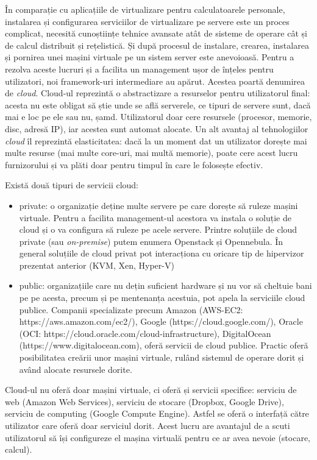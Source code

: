 În comparație cu aplicațiile de virtualizare pentru calculatoarele personale,
instalarea și configurarea serviciilor de virtualizare pe servere este un proces
complicat, necesită cunoștiințe tehnice avansate atât de sisteme de operare cât
și de calcul distribuit și rețelistică. Și după procesul de instalare, crearea,
instalarea și pornirea unei mașini virtuale pe un sistem server este anevoioasă.
Pentru a rezolva aceste lucruri și a facilita un management ușor de înțeles
pentru utilizatori, noi framework-uri intermediare au apărut. Acestea poartă
denumirea de \textit{cloud}. Cloud-ul reprezintă o abstractizare a resurselor
pentru utilizatorul final: acesta nu este obligat să știe unde se află
serverele, ce tipuri de servere sunt, dacă mai e loc pe ele sau nu, șamd.
Utilizatorul doar cere resursele (procesor, memorie, disc, adresă IP), iar
acestea sunt automat alocate. Un alt avantaj al tehnologiilor \textit{cloud} îl
reprezintă elasticitatea: dacă la un moment dat un utilizator dorește mai multe
resurse (mai multe core-uri, mai multă memorie), poate cere acest lucru
furnizorului și va plăti doar pentru timpul în care le folosește efectiv.


Există două tipuri de servicii cloud:

\begin{itemize}
	\item private: o organizație deține multe servere pe care dorește să
		ruleze mașini virtuale. Pentru a facilita management-ul acestora
		va instala o soluție de cloud și o va configura să ruleze pe
		acele servere. Printre soluțiile de cloud private (sau
		\textit{on-premise}) putem enumera Openstack și Opennebula. În
		general soluțiile de cloud privat pot interacționa cu oricare
		tip de hipervizor prezentat anterior (KVM, Xen, Hyper-V)
	\item public: organizațiile care nu dețin suficient hardware și nu vor
		să cheltuie bani pe pe acesta, precum și pe mentenanța acestuia,
		pot apela la serviciile cloud publice. Companii specializate
		precum Amazon (AWS-EC2: https://aws.amazon.com/ec2/), Google
		(https://cloud.google.com/), Oracle (OCI:
		https://cloud.oracle.com/cloud-infrastructure), DigitalOcean
		(https://www.digitalocean.com), oferă servicii de cloud publice.
		Practic oferă posibilitatea creării unor mașini virtuale, rulând
		sistemul de operare dorit și având alocate resursele dorite.
\end{itemize}

Cloud-ul nu oferă doar mașini virtuale, ci oferă și servicii specifice: serviciu
de web (Amazon Web Services), serviciu de stocare (Dropbox, Google Drive),
serviciu de computing (Google Compute Engine). Astfel se oferă o interfață
către utilizator care oferă doar serviciul dorit. Acest lucru are avantajul de a
scuti utilizatorul să își configureze el mașina virtuală pentru ce ar avea
nevoie (stocare, calcul).

